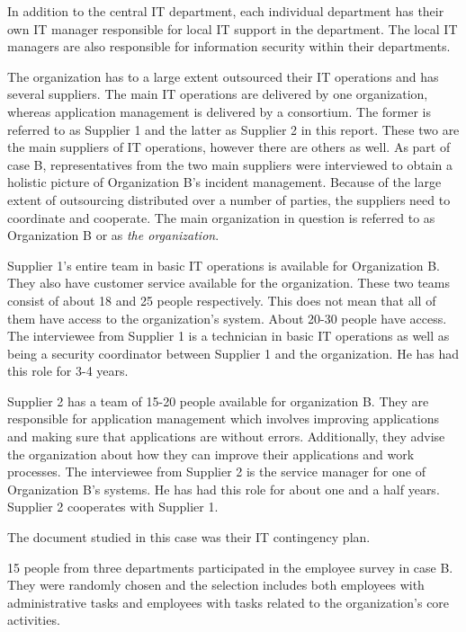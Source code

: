 In addition to the central IT department, %
each individual department has their own IT manager responsible for local IT support in the department. The local IT managers are also responsible for information security within their departments.

The organization has to a large extent outsourced their IT operations and has several suppliers. The main IT operations are delivered by one organization, whereas application management is delivered by a consortium. The former is referred to as Supplier 1 and the latter as Supplier 2 in this report. These two are the main suppliers of IT operations, however there are others as well. As part of case B, representatives from the two main suppliers were interviewed to obtain a holistic picture of Organization B's incident management. Because of the large extent of outsourcing distributed over a number of parties, the suppliers need to coordinate and cooperate. The main organization in question is referred to as Organization B or as \textit{the organization}.

Supplier 1's entire team in basic IT operations is available for Organization B. They also have customer service available for the organization. These two teams consist of about 18 and 25 people respectively. This does not mean that all of them have access to the organization's system. About 20-30 people have access. The interviewee from Supplier 1 is a technician in basic IT operations as well as being a security coordinator between Supplier 1 and the organization. He has had this role for 3-4 years.

Supplier 2 has a team of 15-20 people available for organization B. They are responsible for application management which involves improving applications and making sure that applications are without errors. Additionally, they advise the organization about how they can improve their applications and work processes. The interviewee from Supplier 2 is the service manager for one of Organization B's systems. He has had this role for about one and a half years. Supplier 2 cooperates with Supplier 1.

The document studied in this case was their IT contingency plan.

15 people from three departments participated in the employee survey in case B. They were randomly chosen and the selection includes both employees with administrative tasks and employees with tasks related to the organization's core activities.

